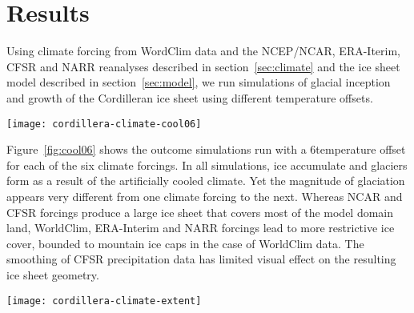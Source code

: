 
\section{Results}
\label{sec:results}

Using climate forcing from WordClim data and the NCEP/NCAR, ERA-Iterim, CFSR and NARR reanalyses described in section~\ref{sec:climate} and the ice sheet model described in section~\ref{sec:model}, we run simulations of glacial inception and growth of the Cordilleran ice sheet using different temperature offsets.

\begin{figure*}[t]
	\vspace*{2mm}
	\begin{center}
		\texttt{[image: cordillera-climate-cool06]}
	\end{center}
	\caption{Ice surface topography (black contours every 1000\,m) and velocity (\unit{m\,yr^{-1}}) after 10\,kyr under a climate 6\degC colder than present for each climate forcing.}
	\label{fig:cool06}
\end{figure*}

Figure~\ref{fig:cool06} shows the outcome simulations run with a 6\degC temperature offset for each of the six climate forcings. In all simulations, ice accumulate and glaciers form as a result of the artificially cooled climate. Yet the magnitude of glaciation appears very different from one climate forcing to the next. Whereas NCAR and CFSR forcings produce a large ice sheet that covers most of the model domain land, WorldClim, ERA-Interim and NARR forcings lead to more restrictive ice cover, bounded to mountain ice caps in the case of WorldClim data. The smoothing of CFSR precipitation data has limited visual effect on the resulting ice sheet geometry.

\begin{figure*}[t]
	\vspace*{2mm}
	\begin{center}
		\texttt{[image: cordillera-climate-extent]}
	\end{center}
	\caption{Extent of ice cover after 10\,kyr as a function of applied temperature offsets for each climate forcing.}
	\label{fig:extent}
\end{figure*}

